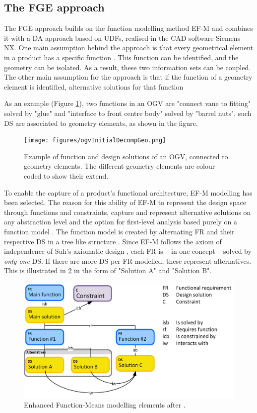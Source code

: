 \documentclass[preprints,article,accept,moreauthors,pdftex]{Definitions/mdpi}
\begin{document}
\subsection{The FGE approach}\label{sec:omfgDSE}
The \acf{FGE} approach builds on the function modelling method \ac{EF-M} and combines it with a \ac{DA} approach based on \acp{UDF}, realised in the CAD software Siemens NX. 
One main assumption behind the approach is that every geometrical element in a product has a specific function \citep{Gero2004}.
This function can be identified, and the geometry can be isolated.
As a result, these two information sets can be coupled. 
The other main assumption for the approach is that if the function of a geometry element is identified, alternative solutions for that function  

As an example (Figure \ref{fig:decompositionExample}), two functions in an \ac{OGV} are "connect vane to fitting" solved by "glue" and "interface to front centre body" solved by "barrel nuts", such \ac{DS} are associated to geometry elements, as shown in the figure.    

\begin{figure}[ht]
    \centering
    \texttt{[image: figures/ogvInitialDecompGeo.png]}
    \caption{Example of function and design solutions of an OGV, connected to geometry elements.
    The different geometry elements are colour coded to show their extend.}
    \label{fig:decompositionExample}
\end{figure}

To enable the capture of a product's functional architecture, \ac{EF-M} modelling has been selected. 
The reason for this ability of \ac{EF-M} to represent the design space through functions and constraints, capture and represent alternative solutions on any abstraction level and the option for first-level analysis based purely on a function model \cite{Muller2019Aiedam}.
The function model is created by alternating \ac{FR} and their respective \ac{DS} in a tree like structure \cite{Schachinger2000}.
Since \ac{EF-M} follows the axiom of independence of Suh's axiomatic design \cite{Suh1990}, each \ac{FR} is -- in one concept -- solved by \textit{only one} \ac{DS}. 
If there are more \ac{DS} per \ac{FR} modelled, these represent alternatives.
This is illustrated in \ref{fig:EFM} in the form of "Solution A" and "Solution B".

\begin{figure}[ht]
    \centering
    \includegraphics[width=.6\textwidth]{figures/efmExplanationBright.png}
    \caption{Enhanced Function-Means modelling elements after \cite{Schachinger2000}.}
    \label{fig:EFM}
\end{figure}
\end{document}
